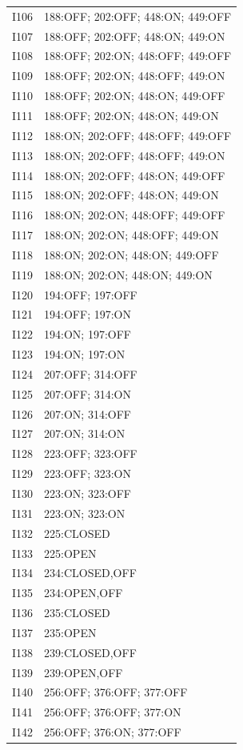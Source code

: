 {\begin{longtable}{lp{.85\linewidth}}
I106 & 188:OFF; 202:OFF; 448:ON; 449:OFF \\
I107 & 188:OFF; 202:OFF; 448:ON; 449:ON \\
I108 & 188:OFF; 202:ON; 448:OFF; 449:OFF \\
I109 & 188:OFF; 202:ON; 448:OFF; 449:ON \\
I110 & 188:OFF; 202:ON; 448:ON; 449:OFF \\
I111 & 188:OFF; 202:ON; 448:ON; 449:ON \\
I112 & 188:ON; 202:OFF; 448:OFF; 449:OFF \\
I113 & 188:ON; 202:OFF; 448:OFF; 449:ON \\
I114 & 188:ON; 202:OFF; 448:ON; 449:OFF \\
I115 & 188:ON; 202:OFF; 448:ON; 449:ON \\
I116 & 188:ON; 202:ON; 448:OFF; 449:OFF \\
I117 & 188:ON; 202:ON; 448:OFF; 449:ON \\
I118 & 188:ON; 202:ON; 448:ON; 449:OFF \\
I119 & 188:ON; 202:ON; 448:ON; 449:ON \\
I120 & 194:OFF; 197:OFF \\
I121 & 194:OFF; 197:ON \\
I122 & 194:ON; 197:OFF \\
I123 & 194:ON; 197:ON \\
I124 & 207:OFF; 314:OFF \\
I125 & 207:OFF; 314:ON \\
I126 & 207:ON; 314:OFF \\
I127 & 207:ON; 314:ON \\
I128 & 223:OFF; 323:OFF \\
I129 & 223:OFF; 323:ON \\
I130 & 223:ON; 323:OFF \\
I131 & 223:ON; 323:ON \\
I132 & 225:CLOSED \\
I133 & 225:OPEN \\
I134 & 234:CLOSED,OFF \\
I135 & 234:OPEN,OFF \\
I136 & 235:CLOSED \\
I137 & 235:OPEN \\
I138 & 239:CLOSED,OFF \\
I139 & 239:OPEN,OFF \\
I140 & 256:OFF; 376:OFF; 377:OFF \\
I141 & 256:OFF; 376:OFF; 377:ON \\
I142 & 256:OFF; 376:ON; 377:OFF \\

\end{longtable}}
